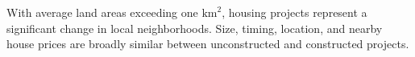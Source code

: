 \documentclass[12pt]{article}
\begin{document}
With average land areas exceeding one $\text{km}^{2}$, housing projects represent a significant change in local neighborhoods.  Size, timing, location, and nearby house prices are broadly similar between unconstructed and constructed projects.  

\end{document}
